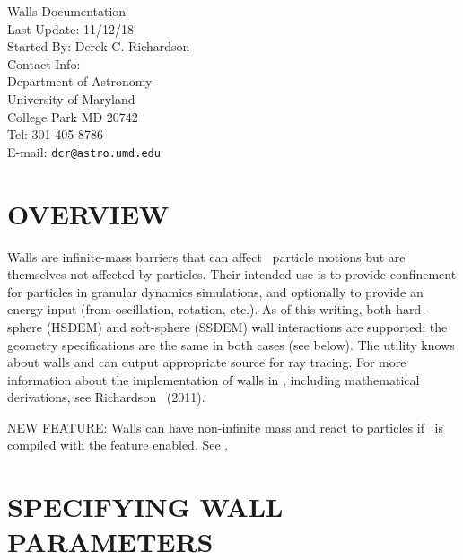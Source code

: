 



\begin{flushleft}

\huge{Walls Documentation}\\
\bigskip\bigskip
\Large{Last Update: 11/12/18}\\
\bigskip\bigskip
\large{Started By: Derek C. Richardson}\\
\bigskip
\large{Contact Info:}\\
Department of Astronomy\\
University of Maryland\\
College Park MD 20742\\
Tel: 301-405-8786\\
E-mail: \texttt{dcr@astro.umd.edu}

\end{flushleft}

\tableofcontents

\section{OVERVIEW}

Walls are infinite-mass barriers that can affect \pkd\ particle
motions but are themselves not affected by particles.  Their
intended use is to provide confinement for particles in granular
dynamics simulations, and optionally to provide an energy input (from
oscillation, rotation, etc.).  As of this writing, both hard-sphere
(HSDEM) and soft-sphere (SSDEM) wall interactions are supported; the
geometry specifications are the same in both cases (see below).  The
 utility knows about walls and can output appropriate
 source for ray tracing.  For more information about the
implementation of walls in \pkd, including mathematical derivations,
see Richardson \etal\ (2011).

NEW FEATURE: Walls can have non-infinite mass and react to
particles if \pkd\ is compiled with the 
feature enabled.  See .

\section{SPECIFYING WALL PARAMETERS}

